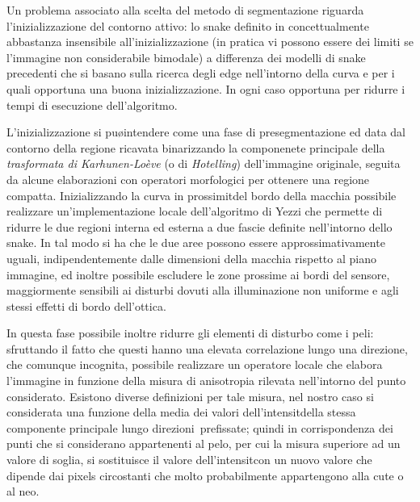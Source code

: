Un problema associato alla scelta del metodo di segmentazione riguarda l'inizializzazione
del contorno attivo: lo snake definito in \cite{Yezzi} concettualmente \e 
abbastanza insensibile all'inizializzazione (in pratica vi possono essere dei limiti se
l'immagine non \e considerabile bimodale) a differenza dei modelli di snake precedenti che
si basano sulla ricerca degli edge nell'intorno della curva e per i quali \e opportuna una
buona inizializzazione.
In ogni caso \e opportuna per ridurre i tempi di esecuzione dell'algoritmo.

L'inizializzazione si pu\o intendere come una fase di presegmentazione ed \e data dal
contorno della regione ricavata binarizzando la componenete principale della
{\it trasformata di Karhunen-Lo\`eve} (o di {\it Hotelling}) dell'immagine originale, seguita
da alcune elaborazioni con operatori morfologici per ottenere una regione compatta.
Inizializzando la curva in prossimit\a del bordo della macchia \e possibile realizzare
un'implementazione locale dell'algoritmo di Yezzi che permette di ridurre le due regioni
interna ed esterna a due fascie definite nell'intorno dello snake.
In tal modo si ha che le due aree possono essere approssimativamente uguali, indipendentemente
dalle dimensioni della macchia rispetto al piano immagine, ed inoltre \e
possibile escludere le zone prossime ai bordi del sensore, maggiormente sensibili ai disturbi
dovuti alla illuminazione non uniforme e agli stessi effetti di bordo dell'ottica.

In questa fase \e possibile inoltre ridurre gli elementi di disturbo come i peli: 
sfruttando il fatto che questi hanno una elevata correlazione lungo una direzione, che
\e comunque incognita, \e possibile realizzare un operatore locale che
elabora l'immagine in funzione della misura di anisotropia rilevata nell'intorno
del punto considerato. 
Esistono diverse definizioni per tale misura, nel nostro caso si \e considerata una funzione
della media dei valori dell'intensit\a della stessa componente principale lungo
direzioni\footnotemark\, prefissate; quindi in corrispondenza dei punti che
si considerano appartenenti al pelo, per cui la misura \e superiore ad un valore di soglia,
si sostituisce il valore dell'intensit\a con un nuovo valore che dipende dai pixels
circostanti che molto probabilmente appartengono alla cute o al neo.


